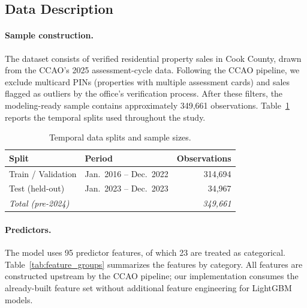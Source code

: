 \documentclass[12pt, draft]{article}
\theoremstyle{plain}
\theoremstyle{definition}
\newcommand{\1}{\mathbf{1}}
\begin{document}
\subsection{Data Description}
\label{subsec:data_description}

\paragraph{Sample construction.} The dataset consists of verified residential property sales in Cook County, drawn from the CCAO's 2025 assessment-cycle data. Following the CCAO pipeline, we exclude multicard PINs (properties with multiple assessment cards) and sales flagged as outliers by the office's verification process. After these filters, the modeling-ready sample contains approximately 349{,}661 observations. Table~\ref{tab:data_splits} reports the temporal splits used throughout the study.

\begin{table}[!ht]
\centering
\caption{Temporal data splits and sample sizes.}
\label{tab:data_splits}
\begin{tabular}{llr}
\toprule
\textbf{Split} & \textbf{Period} & \textbf{Observations} \\
\midrule
Train / Validation  & Jan.\ 2016 -- Dec.\ 2022 & 314{,}694 \\
Test (held-out)     & Jan.\ 2023 -- Dec.\ 2023 & 34{,}967 \\
\midrule
\textit{Total (pre-2024)} & & \textit{349{,}661} \\
\bottomrule
\end{tabular}
\end{table}

\paragraph{Predictors.} The model uses 95 predictor features, of which 23 are treated as categorical. Table~\ref{tab:feature_groups} summarizes the features by category. All features are constructed upstream by the CCAO pipeline; our implementation consumes the already-built feature set without additional feature engineering for LightGBM models.
\end{document}
